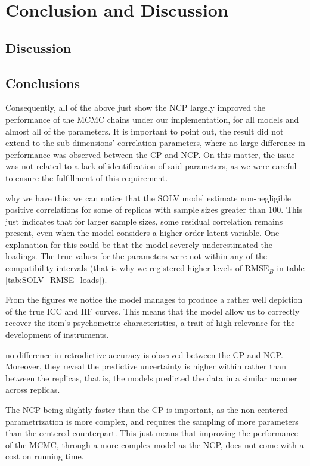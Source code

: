 \chapter{Conclusion and Discussion} \label{cap:conclusions}

\section{Discussion}

\section{Conclusions}

Consequently, all of the above just show the NCP largely improved the performance of the MCMC chains under our implementation, for all models and almost all of the parameters. It is important to point out, the result did not extend to the sub-dimensions' correlation parameters, where no large difference in performance was observed between the CP and NCP. On this matter, the issue was not related to a lack of identification of said parameters, as we were careful to ensure the fulfillment of this requirement.

why we have this: we can notice that the SOLV model estimate non-negligible positive correlations for some of replicas with sample sizes greater than $100$. This just indicates that for larger sample sizes, some residual correlation remains present, even when the model considers a higher order latent variable. One explanation for this could be that the model severely underestimated the loadings. The true values for the parameters were not within any of the compatibility intervals (that is why we registered higher levels of $\text{RMSE}_{B}$ in table \ref{tab:SOLV_RMSE_loads}).

From the figures we notice the model manages to produce a rather well depiction of the true ICC and IIF curves. This means that the model allow us to correctly recover the item's psychometric characteristics, a trait of high relevance for the development of instruments.

no difference in retrodictive accuracy is observed between the CP and NCP. Moreover, they reveal the predictive uncertainty is higher within rather than between the replicas, that is, the models predicted the data in a similar manner across replicas.

The NCP being slightly faster than the CP is important, as the non-centered parametrization is more complex, and requires the sampling of more parameters than the centered counterpart. This just means that improving the performance of the MCMC, through a more complex model as the NCP, does not come with a cost on running time.

